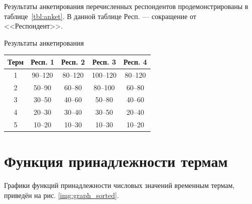 Результаты анкетирования перечисленных респондентов продемонстрированы в таблице~\ref{tbl:anket}. В данной таблице Респ. --- сокращение от <<Респондент>>.

\begin{center}
	\begin{threeparttable}
			\caption{Результаты анкетирования}
		\label{tbl:anket}
	\begin{tabular}{|c|c|c|c|c|}\hline
		Терм & Респ. 1 & Респ. 2 & Респ. 3  & Респ. 4 \\ \hline
		1 & 90--120  &80--120  & 100--120 & 80--120\\ \hline 
		2 & 50--90  &  60--80  & 80--100& 60--80\\ \hline
		3&  30--50  & 40--60   &50--80 &  40--60 \\ \hline
		4 &  20--30 & 30--40  & 30--50 & 20--40 \\ \hline
		5 & 10--20    & 10--30 &10--30 &10--20  \\ \hline
\end{tabular}	
\end{threeparttable}
\end{center}

\section{Функция принадлежности термам}

Графики функций принадлежности числовых значений временным термам, приведён на рис. \ref{img:graph_sorted}.
\begin{center}
	\label{img:graph_sorted}
\end{center}

